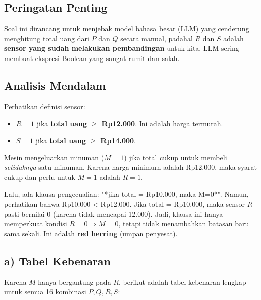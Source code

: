 \documentclass[12pt,a4paper]{article}
\begin{document}
\subsection*{Peringatan Penting}
Soal ini dirancang untuk menjebak model bahasa besar (LLM) yang cenderung menghitung total uang dari $P$ dan $Q$ secara manual, padahal $R$ dan $S$ adalah \textbf{sensor yang sudah melakukan pembandingan} untuk kita. LLM sering membuat ekspresi Boolean yang sangat rumit dan salah.

\subsection*{Analisis Mendalam}
Perhatikan definisi sensor:
\begin{itemize}
    \item $R = 1$ jika \textbf{total uang $\ge$ Rp12.000}. Ini adalah harga termurah.
    \item $S = 1$ jika \textbf{total uang $\ge$ Rp14.000}.
\end{itemize}
Mesin mengeluarkan minuman ($M=1$) jika total cukup untuk membeli \emph{setidaknya} satu minuman. Karena harga minimum adalah Rp12.000, maka syarat cukup dan perlu untuk $M=1$ adalah \textbf{$R=1$}.

Lalu, ada klausa pengecualian: "*jika total = Rp10.000, maka M=0*". Namun, perhatikan bahwa Rp10.000 < Rp12.000. Jika total = Rp10.000, maka sensor $R$ pasti bernilai 0 (karena tidak mencapai 12.000). Jadi, klausa ini hanya memperkuat kondisi $R=0 \Rightarrow M=0$, tetapi tidak menambahkan batasan baru sama sekali. Ini adalah \textbf{red herring} (umpan penyesat).

\subsection*{a) Tabel Kebenaran}
Karena $M$ hanya bergantung pada $R$, berikut adalah tabel kebenaran lengkap untuk semua 16 kombinasi $P, Q, R, S$:
\end{document}
